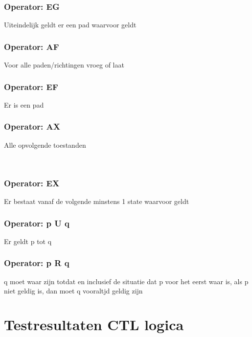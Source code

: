 \subsection{Operator: EG}
Uiteindelijk geldt er een pad waarvoor geldt

\subsection{Operator: AF}
Voor alle paden/richtingen vroeg of laat
\subsection{Operator: EF}
Er is een pad
\subsection{Operator: AX}
Alle opvolgende toestanden

~\cite{locke_2020}
\subsection{Operator: EX}
Er bestaat vanaf de volgende minstens 1 state waarvoor geldt
\subsection{Operator: p U q}
Er geldt p tot q
~\cite{gnsguides}
\subsection{Operator: p R q}
q moet waar zijn totdat en inclusief de situatie dat p voor het eerst waar is, als p niet geldig is, dan moet q vooraltjd geldig zijn

\chapter{Testresultaten CTL logica}




